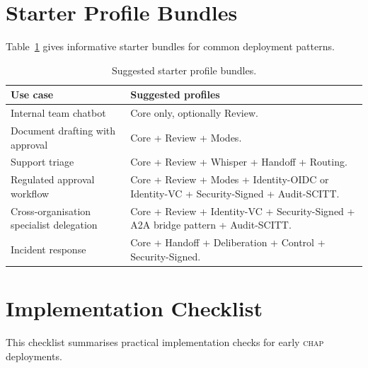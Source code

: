 \documentclass[11pt]{article}
\newcommand{\chap}{\textsc{chap}}
\begin{document}
\section{Starter Profile Bundles}
\label{app:profile-bundles}

Table~\ref{tab:bundles} gives informative starter bundles for common deployment patterns.

\begin{table}[h]
\centering
\caption{Suggested starter profile bundles.}
\label{tab:bundles}
\begin{tabularx}{\textwidth}{@{}p{3.3cm}X@{}}
\toprule
\textbf{Use case} & \textbf{Suggested profiles} \\
\midrule
Internal team chatbot & Core only, optionally Review. \\
Document drafting with approval & Core + Review + Modes. \\
Support triage & Core + Review + Whisper + Handoff + Routing. \\
Regulated approval workflow & Core + Review + Modes + Identity-OIDC or Identity-VC + Security-Signed + Audit-SCITT. \\
Cross-organisation specialist delegation & Core + Review + Identity-VC + Security-Signed + A2A bridge pattern + Audit-SCITT. \\
Incident response & Core + Handoff + Deliberation + Control + Security-Signed. \\
\bottomrule
\end{tabularx}
\end{table}

\section{Implementation Checklist}
\label{app:implementation-checklist}

This checklist summarises practical implementation checks for early \chap{} deployments.
\end{document}
